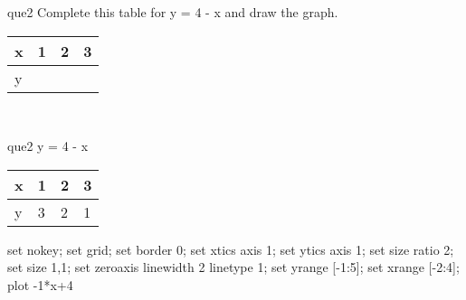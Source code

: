 \documentclass[13.5pt, varwidth=true]{beamer}
\begin{document}
\begin{frame}[shrink=19,fragile]
	\begin{beamercolorbox}[rounded=true, left, shadow=true,wd=14.8cm]{que2}
		 Complete this table for y = 4 - x and draw the graph. \\[0.3cm] \renewcommand{\arraystretch}{1.2}\begin{tabular}{|C|C|C|C|} \hline x & 1 & 2 & 3 \\ \hline y & & & \\ \hline \end{tabular}\\[0.3cm]
	\end{beamercolorbox}
\end{frame}
\begin{frame}[shrink=19,fragile]
	\begin{beamercolorbox}[rounded=true, left, shadow=true,wd=14.8cm]{que2}
		y = 4 - x\renewcommand{\arraystretch}{1.2}\begin{tabular}{|C|C|C|C|} \hline x & 1 & 2 & 3 \\ \hline y & 3 & 2 & 1\\ \hline \end{tabular}\begin{gnuplot}[terminal=pdf] set nokey; set grid; set border 0; set xtics axis 1; set ytics axis 1; set size ratio 2; set size 1,1; set zeroaxis linewidth 2 linetype 1; set yrange [-1:5]; set xrange [-2:4]; plot -1*x+4 \end{gnuplot}
	\end{beamercolorbox}
\end{frame}
\end{document}
